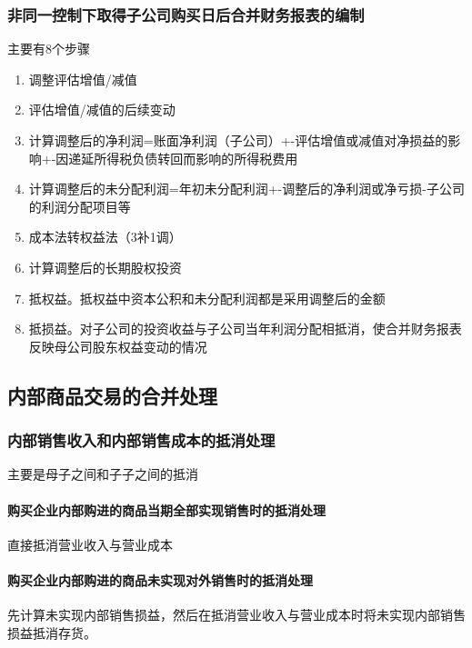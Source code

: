 \documentclass[UTF8,12pt]{ctexart}
\numberwithin{equation}{section} %
\numberwithin{figure}{section}
\numberwithin{table}{section}
\begin{document}
	\subsubsection{非同一控制下取得子公司购买日后合并财务报表的编制}
	主要有8个步骤
	\begin{enumerate}
		\item 调整评估增值/减值
		
		\item 评估增值/减值的后续变动
		
		\item 计算调整后的净利润=账面净利润（子公司）+-评估增值或减值对净损益的影响+-因递延所得税负债转回而影响的所得税费用
		
		\item 计算调整后的未分配利润=年初未分配利润+-调整后的净利润或净亏损-子公司的利润分配项目等
		
		\item 成本法转权益法（3补1调）
		
		\item 计算调整后的长期股权投资
		
		\item 抵权益。抵权益中资本公积和未分配利润都是采用调整后的金额
		
		\item 抵损益。对子公司的投资收益与子公司当年利润分配相抵消，使合并财务报表反映母公司股东权益变动的情况
	\end{enumerate}
	
	\subsection{内部商品交易的合并处理}
	\subsubsection{内部销售收入和内部销售成本的抵消处理}
	主要是母子之间和子子之间的抵消
	\paragraph{购买企业内部购进的商品当期全部实现销售时的抵消处理}
	直接抵消营业收入与营业成本
	
	\paragraph{购买企业内部购进的商品未实现对外销售时的抵消处理}
	先计算未实现内部销售损益，然后在抵消营业收入与营业成本时将未实现内部销售损益抵消存货。
	
\end{document}
